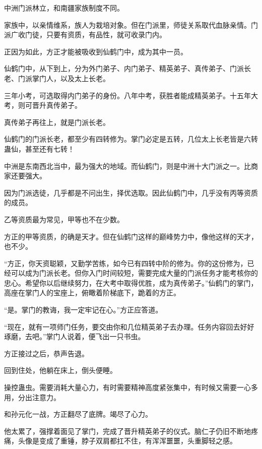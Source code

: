 
\begin{this_body}



中洲门派林立，和南疆家族制度不同。

家族中，以亲情维系，族人为栽培对象。但在门派里，师徒关系取代血脉亲情。门派广收门徒，只要有资质，有品性，就可收录门内。

正因为如此，方正才能被吸收到仙鹤门中，成为其中一员。

仙鹤门中，从下到上，分为外门弟子、内门弟子、精英弟子、真传弟子、门派长老、门派掌门人，以及太上长老。

三年小考，可选取得内门弟子的身份。八年中考，获胜者能成精英弟子。十五年大考，则可晋升真传弟子。

真传弟子再往上，就是门派长老。

仙鹤门的门派长老，都至少有四转修为。掌门必定是五转，几位太上长老皆是六转蛊仙，甚至还有七转！

中洲是东南西北当中，最为强大的地域。而仙鹤门，则是中洲十大门派之一。比商家还要强大。

因为门派选徒，几乎都是不问出生，择优选取。因此仙鹤门中，几乎没有丙等资质的成员。

乙等资质最为常见，甲等也不在少数。

方正的甲等资质，的确是天才。但在仙鹤门这样的巅峰势力中，像他这样的天才，也不少。

“方正，你天资聪颖，又勤学苦练，如今已有四转中阶的修为。你的这份修为，已经可以成为门派长老。但你入门时间较短，需要完成大量的门派任务才能考核你的忠心。希望你以后继续努力，在大考中取得优胜，成为真传弟子。”仙鹤门的掌门，高座在掌门人的宝座上，俯瞰着阶梯底下，跪着的方正。

“是。掌门的教诲，我一定牢记在心。”方正应答道。

“现在，就有一项师门任务，要交由你和几位精英弟子去办理。任务内容回去好好琢磨，去吧。”掌门人说着，便飞出一只书虫。

方正接过之后，恭声告退。

回到住处，他躺在床上，倒头便睡。

操控蛊虫。需要消耗大量心力，有时需要精神高度紧张集中，有时候又需要一心多用，分出注意力。

和孙元化一战，方正翻尽了底牌。竭尽了心力。

他太累了，强撑着面见了掌门，完成了晋升精英弟子的仪式。脑仁子仍旧不断地疼痛，头像是变成了重锤，脖子双肩都扛不住，有浑浑噩噩，头重脚轻之感。


\end{this_body}
